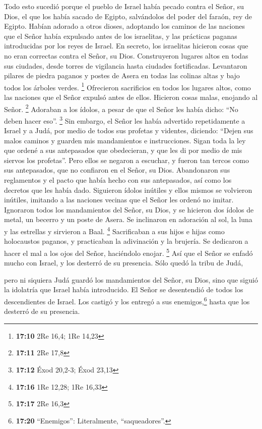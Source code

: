  Todo esto sucedió porque el pueblo de Israel había pecado
contra el Señor, su Dios, el que los había sacado de Egipto, salvándolos
del poder del faraón, rey de Egipto. Habían adorado a otros dioses,
 adoptando los caminos de las naciones que el Señor había
expulsado antes de los israelitas, y las prácticas paganas introducidas
por los reyes de Israel.  En secreto, los israelitas
hicieron cosas que no eran correctas contra el Señor, su Dios.
Construyeron lugares altos en todas sus ciudades, desde torres de
vigilancia hasta ciudades fortificadas.  Levantaron
pilares de piedra paganos y postes de Asera en todas las colinas altas y
bajo todos los árboles verdes. \footnote{\textbf{17:10} 2Re 16,4; 1Re
  14,23}  Ofrecieron sacrificios en todos los lugares
altos, como las naciones que el Señor expulsó antes de ellos. Hicieron
cosas malas, enojando al Señor. \footnote{\textbf{17:11} 2Re 17,8}
 Adoraban a los ídolos, a pesar de que el Señor les había
dicho: ``No deben hacer eso''. \footnote{\textbf{17:12} Éxod 20,2-3;
  Éxod 23,13}  Sin embargo, el Señor les había advertido
repetidamente a Israel y a Judá, por medio de todos sus profetas y
videntes, diciendo: ``Dejen sus malos caminos y guarden mis mandamientos
e instrucciones. Sigan toda la ley que ordené a sus antepasados que
obedecieran, y que les di por medio de mis siervos los profetas''.
 Pero ellos se negaron a escuchar, y fueron tan tercos
como sus antepasados, que no confiaron en el Señor, su Dios.
 Abandonaron sus reglamentos y el pacto que había hecho
con sus antepasados, así como los decretos que les había dado. Siguieron
ídolos inútiles y ellos mismos se volvieron inútiles, imitando a las
naciones vecinas que el Señor les ordenó no imitar. 
Ignoraron todos los mandamientos del Señor, su Dios, y se hicieron dos
ídolos de metal, un becerro y un poste de Asera. Se inclinaron en
adoración al sol, la luna y las estrellas y sirvieron a Baal.
\footnote{\textbf{17:16} 1Re 12,28; 1Re 16,33} 
Sacrificaban a sus hijos e hijas como holocaustos paganos, y practicaban
la adivinación y la brujería. Se dedicaron a hacer el mal a los ojos del
Señor, haciéndolo enojar. \footnote{\textbf{17:17} 2Re 16,3}
 Así que el Señor se enfadó mucho con Israel, y los
desterró de su presencia. Sólo quedó la tribu de Judá,

 pero ni siquiera Judá guardó los mandamientos del Señor,
su Dios, sino que siguió la idolatría que Israel había introducido.
 El Señor se desentendió de todos los descendientes de
Israel. Los castigó y los entregó a sus enemigos,\footnote{\textbf{17:20}
  ``Enemigos'': Literalmente, ``saqueadores''.} hasta que los desterró
de su presencia.

